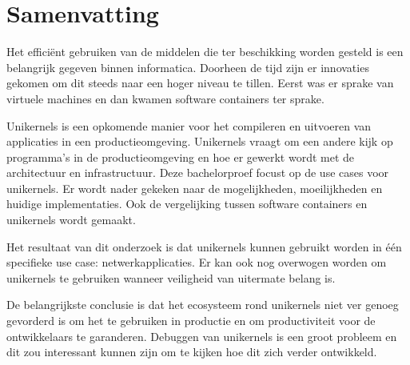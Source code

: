 
\chapter*{Samenvatting}

Het efficiënt gebruiken van de middelen die ter beschikking worden gesteld is een belangrijk gegeven binnen informatica. Doorheen de tijd zijn er innovaties gekomen om dit steeds naar een hoger niveau te tillen. Eerst was er sprake van virtuele machines en dan kwamen software containers ter sprake.

Unikernels is een opkomende manier voor het compileren en uitvoeren van applicaties in een productieomgeving. Unikernels vraagt om een andere kijk op programma's in de productieomgeving en hoe er gewerkt wordt met de architectuur en infrastructuur. Deze bachelorproef focust op de use cases voor unikernels. Er wordt nader gekeken naar de mogelijkheden, moeilijkheden en huidige implementaties. Ook de vergelijking tussen software containers en unikernels wordt gemaakt.

Het resultaat van dit onderzoek is dat unikernels kunnen gebruikt worden in één specifieke use case: netwerkapplicaties. Er kan ook nog overwogen worden om unikernels te gebruiken wanneer veiligheid van uitermate belang is.

De belangrijkste conclusie is dat het ecosysteem rond unikernels niet ver genoeg gevorderd is om het te gebruiken in productie en om productiviteit voor de ontwikkelaars te garanderen. Debuggen van unikernels is een groot probleem en dit zou interessant kunnen zijn om te kijken hoe dit zich verder ontwikkeld.
